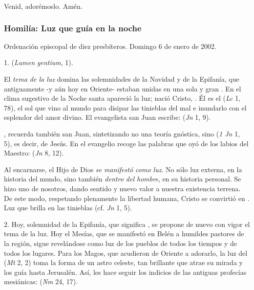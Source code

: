 \begin{body}
\begin{body}
Venid, adorémoslo. Amén.

\subsubsection{Homilía: Luz que guía en la noche}

Ordenación episcopal de diez presbíteros. Domingo 6 de enero de 2002.

1.  (\emph{Lumen gentium}, 1).

El \emph{tema de la luz} domina las solemnidades de la Navidad y de la Epifanía, que antiguamente -y aún hoy en Oriente- estaban unidas en una sola y gran . En el clima sugestivo de la Noche santa apareció la luz; nació Cristo, . Él es el  (\emph{Lc} 1, 78), el sol que vino al mundo para disipar las tinieblas del mal e inundarlo con el esplendor del amor divino. El evangelista san Juan escribe:  (\emph{Jn} 1, 9).

, recuerda también san Juan, sintetizando no una teoría gnóstica, sino  (\emph{1 Jn} 1, 5), es decir, de Jesús. En el evangelio recoge las palabras que oyó de los labios del Maestro:  (\emph{Jn} 8, 12).

Al encarnarse, el Hijo de Dios \emph{se manifestó como luz}. No sólo luz externa, en la historia del mundo, sino también \emph{dentro del hombre}, en su historia personal. Se hizo uno de nosotros, dando sentido y nuevo valor a nuestra existencia terrena. De este modo, respetando plenamente la libertad humana, Cristo se convirtió en . Luz que brilla en las tinieblas (cf. \emph{Jn} 1, 5).

2. Hoy, solemnidad de la Epifanía, que significa , se propone de nuevo con vigor el tema de la luz. Hoy el Mesías, que se manifestó en Belén a humildes pastores de la región, sigue revelándose como luz de los pueblos de todos los tiempos y de todos los lugares. Para los Magos, que acudieron de Oriente a adorarlo, la luz del  (\emph{Mt} 2, 2) toma la forma de un astro celeste, tan brillante que atrae su mirada y los guía hasta Jerusalén. Así, les hace seguir los indicios de las antiguas profecías mesiánicas:  (\emph{Nm} 24, 17).


\end{body}
\end{body}
